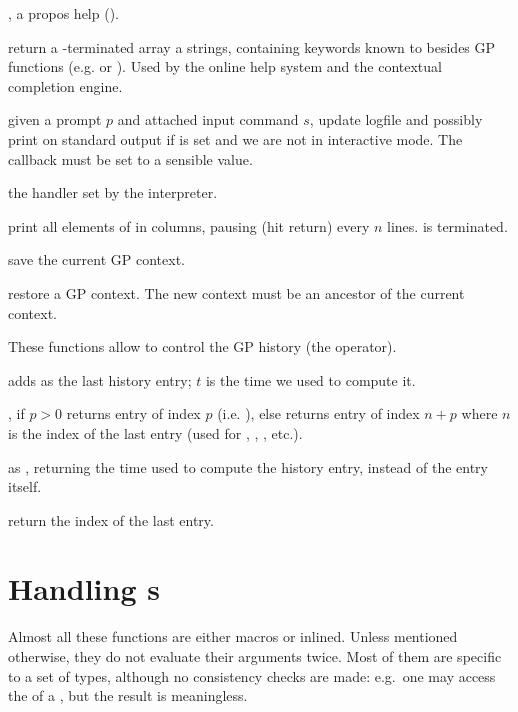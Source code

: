 \item {}, a propos help ().

 return a
-terminated array a strings, containing keywords known to
 besides GP functions (e.g.  or ).
Used by the online help system and the contextual completion engine.

 given a prompt
$p$ and attached input command $s$, update logfile and possibly
print on standard output if  is set and we are not in interactive
mode. The callback  must be set to a sensible
value.

 the  handler
set by the  interpreter.

print all elements of  in columns, pausing (hit return)
every $n$ lines.  is  terminated.


 save the current GP
context.

 restore a GP context.
The new context must be an ancestor of the current context.


These functions allow to control the GP history (the \kbd{\%} operator).

 adds  as the last history
entry; $t$ is the time we used to compute it.

, if $p>0$ returns entry of index $p$
(i.e. ), else returns entry of index $n+p$ where $n$ is the
index of the last entry (used for \kbd{\%}, , , etc.).

 as ,
returning the time used to compute the history entry, instead of the entry
itself.

 return the index of the last entry.

\section{Handling s}
\noindent Almost all these functions are either macros or inlined. Unless
mentioned otherwise, they do not evaluate their arguments twice. Most of them
are specific to a set of types, although no consistency checks are made:
e.g.~one may access the  of a , but the result is
meaningless.

